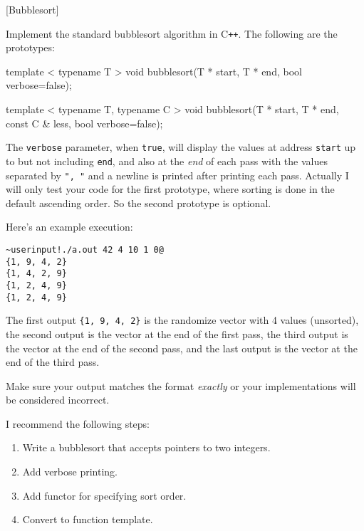 [Bubblesort]

Implement the standard bubblesort algorithm in C\texttt{++}.
The following are the prototypes:
\begin{console}[frame=single, fontsize=\footnotesize]
template < typename T >
void bubblesort(T * start, T * end, bool verbose=false);

template < typename T, typename C >
void bubblesort(T * start, T * end, const C & less, bool verbose=false);
\end{console}
The \verb!verbose! parameter, when \verb!true!, will
display the values at address \verb!start! up to but not including \verb!end!,
and also at the \textit{end} of each pass with the values
separated by \verb!", "! and
a newline is printed after printing each pass.
Actually I will only test your code for the first prototype, where
sorting is done in the default ascending order.
So the second prototype is optional.

Here's an example execution:
\begin{Verbatim}[frame=single,commandchars=\~\!\@,fontsize=\footnotesize]
~userinput!./a.out 42 4 10 1 0@
{1, 9, 4, 2}
{1, 4, 2, 9}
{1, 2, 4, 9}
{1, 2, 4, 9}
\end{Verbatim}
The first output \verb!{1, 9, 4, 2}! is the randomize vector with 4
values (unsorted),
the second output is the vector at the end of the first pass,
the third output is the vector at the end of the second pass, and the
last output is the vector at the end of the third pass.

Make sure your output matches the format \textit{exactly}
or your implementations will be considered incorrect.

I recommend the following steps:
\begin{enumerate}[nosep]
\item Write a bubblesort that accepts pointers to two integers.
\item Add verbose printing.
\item Add functor for specifying sort order.
\item Convert to function template.
\end{enumerate}

